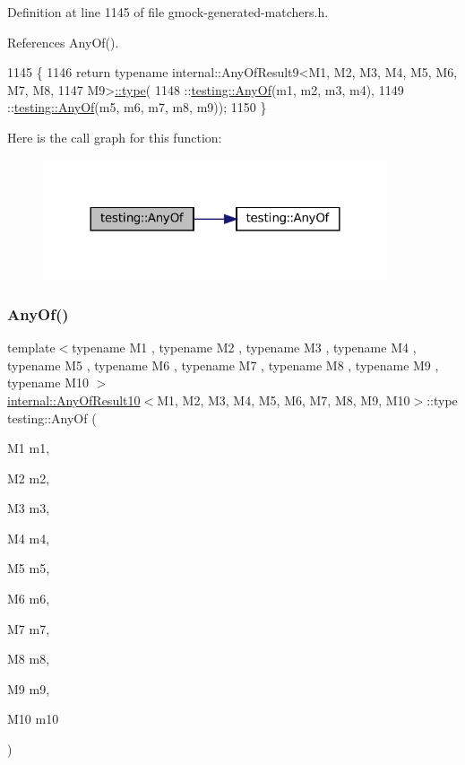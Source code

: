 Definition at line 1145 of file gmock-\/generated-\/matchers.\+h.



References Any\+Of().


\begin{DoxyCode}
1145                                                                      \{
1146   \textcolor{keywordflow}{return} \textcolor{keyword}{typename} internal::AnyOfResult9<M1, M2, M3, M4, M5, M6, M7, M8,
1147       M9>\hyperlink{namespacegenerate__debs_a50bc9a7ecac9584553e089a448bcde58}{::type}(
1148       ::\hyperlink{namespacetesting_a81cfefd9f75cdce827d5bc873cf73aac}{testing::AnyOf}(m1, m2, m3, m4),
1149       ::\hyperlink{namespacetesting_a81cfefd9f75cdce827d5bc873cf73aac}{testing::AnyOf}(m5, m6, m7, m8, m9));
1150 \}
\end{DoxyCode}
Here is the call graph for this function\+:
\nopagebreak
\begin{figure}[H]
\begin{center}
\leavevmode
\includegraphics[width=288pt]{namespacetesting_a873c812db953aebd4bf2ffbff0e8d770_cgraph}
\end{center}
\end{figure}
\mbox{\label{namespacetesting_a1797921d3ed04c7f13dfa8f36bf0bf1c}} 
\subsubsection{\texorpdfstring{Any\+Of()}{AnyOf()}\hspace{0.1cm}{\footnotesize\ttfamily [9/9]}}
{\footnotesize\ttfamily template$<$typename M1 , typename M2 , typename M3 , typename M4 , typename M5 , typename M6 , typename M7 , typename M8 , typename M9 , typename M10 $>$ \\
\hyperlink{structtesting_1_1internal_1_1AnyOfResult10}{internal\+::\+Any\+Of\+Result10}$<$M1, M2, M3, M4, M5, M6, M7, M8, M9, M10$>$\+::type testing\+::\+Any\+Of (\begin{DoxyParamCaption}\item[{M1}]{m1,  }\item[{M2}]{m2,  }\item[{M3}]{m3,  }\item[{M4}]{m4,  }\item[{M5}]{m5,  }\item[{M6}]{m6,  }\item[{M7}]{m7,  }\item[{M8}]{m8,  }\item[{M9}]{m9,  }\item[{M10}]{m10 }\end{DoxyParamCaption})\hspace{0.3cm}{\ttfamily [inline]}}



